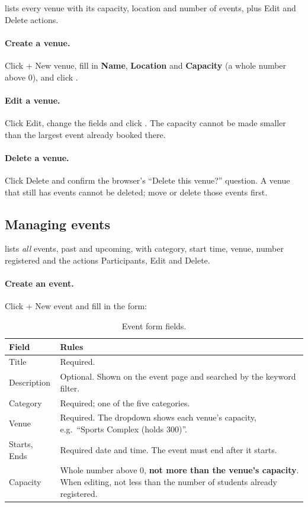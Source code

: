 \documentclass[11pt,a4paper]{article}
\begin{document}
 lists every venue with its capacity, location and number of events, plus
\textsf{Edit} and \textsf{Delete} actions.

\paragraph{Create a venue.} Click \textsf{+ New venue}, fill in \textbf{Name}, \textbf{Location} and
\textbf{Capacity} (a whole number above 0), and click .

\paragraph{Edit a venue.} Click \textsf{Edit}, change the fields and click . The
capacity cannot be made smaller than the largest event already booked there.

\paragraph{Delete a venue.} Click \textsf{Delete} and confirm the browser's ``Delete this venue?''
question. A venue that still has events cannot be deleted; move or delete those events first.

\subsection{Managing events}

 lists \emph{all} events, past and upcoming, with category, start time, venue,
number registered and the actions \textsf{Participants}, \textsf{Edit} and \textsf{Delete}.

\paragraph{Create an event.} Click \textsf{+ New event} and fill in the form:

\begin{table}[H]
\centering
\small
\begin{tabularx}{\linewidth}{@{}l X@{}}
\toprule
\textbf{Field} & \textbf{Rules} \\
\midrule
Title        & Required. \\
Description  & Optional. Shown on the event page and searched by the keyword filter. \\
Category     & Required; one of the five categories. \\
Venue        & Required. The dropdown shows each venue's capacity, e.g.\ ``Sports Complex (holds 300)''. \\
Starts, Ends & Required date and time. The event must end after it starts. \\
Capacity     & Whole number above 0, \textbf{not more than the venue's capacity}. When editing, not less
               than the number of students already registered. \\
\bottomrule
\end{tabularx}
\caption{Event form fields.}
\end{table}
\end{document}
